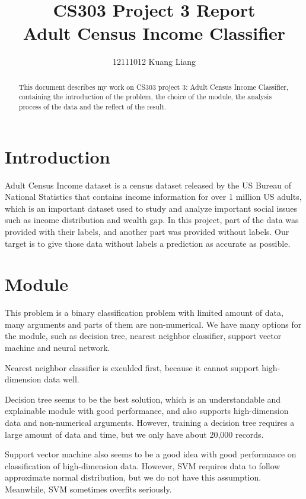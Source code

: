 \documentclass[lettersize,journal]{IEEEtran}
\begin{document}
\title{{\huge CS303 Project 3 Report\\}{
Adult Census Income Classifier}}

\author{12111012 Kuang Liang}

\maketitle

\begin{abstract}
This document describes my work on CS303 project 3: Adult Census Income Classifier, containing the introduction of the problem, the choice of the module, the analysis process of the data and the reflect of the result.
\end{abstract}

\section{Introduction}

 Adult Census Income dataset is a census dataset released by the US Bureau of National Statistics that contains income information for over 1 million US adults, which is an important dataset used to study and analyze important social issues such as income distribution and wealth gap. In this project, part of the data was provided with their labels, and another part was provided without labels. Our target is to give those data without labels a prediction as accurate as possible.

\section{Module}

This problem is a binary classification problem with limited amount of data, many arguments and parts of them are non-numerical. We have many options for the module, such as decision tree, nearest neighbor classifier, support vector machine and neural network.

Nearest neighbor classifier is exculded first, because it cannot support high-dimension data well.

Decision tree seems to be the best solution, which is an understandable and explainable module with good performance, and also supports high-dimension data and non-numerical arguments. However, training a decision tree requires a large amount of data and time, but we only have about 20,000 records.

Support vector machine also seems to be a good idea with good performance on classification of high-dimension data. However, SVM requires data to follow approximate normal distribution, but we do not have this assumption. Meanwhile, SVM sometimes overfits seriously.
\end{document}
